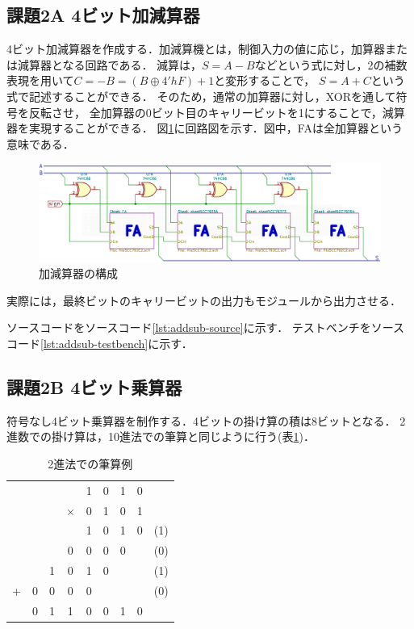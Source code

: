 \subsection{課題2A 4ビット加減算器}
4ビット加減算器を作成する．加減算機とは，制御入力の値に応じ，加算器または減算器となる回路である．
減算は，$S=A-B$などという式に対し，2の補数表現を用いて$C = -B = (B \oplus 4'hF) + 1$と変形することで，
$S=A+C$という式で記述することができる．
%
そのため，通常の加算器に対し，XORを通して符号を反転させ，
全加算器の0ビット目のキャリービットを1にすることで，減算器を実現することができる．
図\ref{fig:fa-sign-sch}に回路図を示す．図中，FAは全加算器という意味である．
\begin{figure}[tbp]
  \includegraphics[angle=0,width=160mm]{week3/pics/FA-sign-sch.png}
  \centering
   \caption{加減算器の構成} %
   \label{fig:fa-sign-sch} %
\end{figure}
実際には，最終ビットのキャリービットの出力もモジュールから出力させる．

ソースコードをソースコード\ref{lst:addsub-source}に示す．
テストベンチをソースコード\ref{lst:addsub-testbench}に示す．


\subsection{課題2B 4ビット乗算器}
符号なし4ビット乗算器を制作する．4ビットの掛け算の積は8ビットとなる．
2進数での掛け算は，10進法での筆算と同じように行う(表\ref{tab:binarymult})．

\begin{table}[htb]
  \centering
  \caption{2進法での筆算例}
  \label{tab:binarymult}
  \begin{tabular}{ccccccccc}
     & & & &1&0&1&0&\\
     & & &$\times$&0&1&0&1&\\ \hline
     & & & &1&0&1&0&(1)\\
     & & &0&0&0&0& &(0)\\
     & &1&0&1&0& & &(1)\\
    +&0&0&0&0& & & &(0)\\ \hline
     &0&1&1&0&0&1&0&\\
  \end{tabular}
\end{table}

